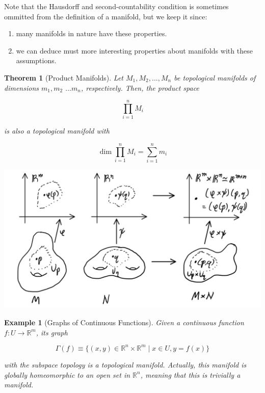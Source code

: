 \documentclass{article}
\newtheorem{theorem}{Theorem}[section]
\newtheorem{example}{Example}[section]
\theoremstyle{remark}
\theoremstyle{definition}
\begin{document}
    Note that the Hausdorff and second-countability condition is sometimes ommitted from the definition of a manifold, but we keep it since: 

    \begin{enumerate}
      \item many manifolds in nature have these properties. 
      \item we can deduce must more interesting properties about manifolds with these assumptions.
    \end{enumerate}

    \begin{theorem}[Product Manifolds]
      Let $M_1, M_2, ..., M_n$ be topological manifolds of dimensions $m_1, m_2$ $...m_n$, respectively. Then, the product space 

        \[\prod_{i=1}^n M_i\]

      is also a topological manifold with 

      \[\dim{\prod_{i=1}^n M_i} = \sum_{i=1}^n m_i \]

      \begin{center}
        \includegraphics[scale=0.25]{img/Product_Manifolds.PNG}
      \end{center}
    \end{theorem}

    \begin{example}[Graphs of Continuous Functions]
      Given a continuous function $f: U \longrightarrow \mathbb{R}^m$, its graph

        \[\Gamma (f) \equiv \{(x, y) \in \mathbb{R}^n \times \mathbb{R}^m \; | \;  x\in U, y = f(x)\}\]

      with the subspace topology is a topological manifold. Actually, this manifold is \textit{globally homeomorphic} to an open set in $\mathbb{R}^n$, meaning that this is trivially a manifold. 
    \end{example}
\end{document}
